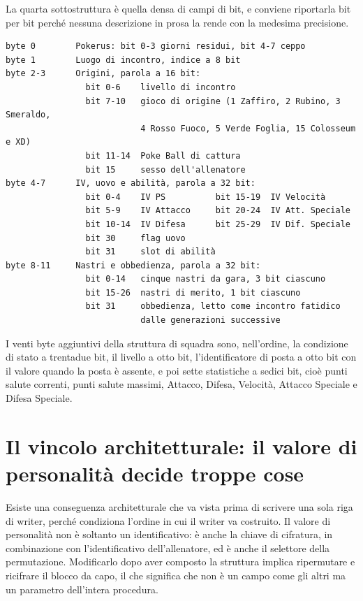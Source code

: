 La quarta sottostruttura è quella densa di campi di bit, e conviene riportarla bit per bit perché nessuna descrizione in prosa la rende con la medesima precisione.

\begin{verbatim}
byte 0        Pokerus: bit 0-3 giorni residui, bit 4-7 ceppo
byte 1        Luogo di incontro, indice a 8 bit
byte 2-3      Origini, parola a 16 bit:
                bit 0-6    livello di incontro
                bit 7-10   gioco di origine (1 Zaffiro, 2 Rubino, 3 Smeraldo,
                           4 Rosso Fuoco, 5 Verde Foglia, 15 Colosseum e XD)
                bit 11-14  Poke Ball di cattura
                bit 15     sesso dell'allenatore
byte 4-7      IV, uovo e abilità, parola a 32 bit:
                bit 0-4    IV PS          bit 15-19  IV Velocità
                bit 5-9    IV Attacco     bit 20-24  IV Att. Speciale
                bit 10-14  IV Difesa      bit 25-29  IV Dif. Speciale
                bit 30     flag uovo
                bit 31     slot di abilità
byte 8-11     Nastri e obbedienza, parola a 32 bit:
                bit 0-14   cinque nastri da gara, 3 bit ciascuno
                bit 15-26  nastri di merito, 1 bit ciascuno
                bit 31     obbedienza, letto come incontro fatidico
                           dalle generazioni successive
\end{verbatim}

I venti byte aggiuntivi della struttura di squadra sono, nell'ordine, la condizione di stato a trentadue bit, il livello a otto bit, l'identificatore di posta a otto bit con il valore  quando la posta è assente, e poi sette statistiche a sedici bit, cioè punti salute correnti, punti salute massimi, Attacco, Difesa, Velocità, Attacco Speciale e Difesa Speciale.

\section{Il vincolo architetturale: il valore di personalità decide troppe cose}

Esiste una conseguenza architetturale che va vista prima di scrivere una sola riga di writer, perché condiziona l'ordine in cui il writer va costruito. Il valore di personalità non è soltanto un identificativo: è anche la chiave di cifratura, in combinazione con l'identificativo dell'allenatore, ed è anche il selettore della permutazione. Modificarlo dopo aver composto la struttura implica ripermutare e ricifrare il blocco da capo, il che significa che non è un campo come gli altri ma un parametro dell'intera procedura.

